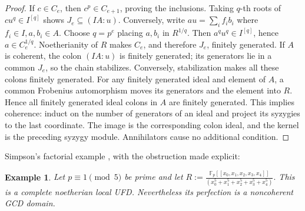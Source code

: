 \documentclass[11pt,a4paper]{amsart}
\numberwithin{equation}{section}
\newtheorem{example}[theorem]{Example}\newtheorem{notation}[theorem]{Notation}
\newcommand{\FF}{\mathbb F}
\begin{document}
\begin{proof}
If $c\in C_e$, then $c^p\in C_{e+1}$, proving the inclusions.
Taking $q$-th roots of	$cu^q\in I^{[q]}$ shows $J_e\subseteq(IA:u)$.
Conversely, write
$ au=\sum_i f_i b_i$ where $ f_i\in I, a,b_i\in A.$
Choose $q=p^e$ placing $a,b_i$ in $R^{1/q}$.
Then $a^qu^q\in I^{[q]}$, hence $a\in C_e^{1/q}$.
Noetherianity of $R$ makes $C_e$, and therefore $J_e$,
finitely generated.
 If $A$ is coherent, the colon $(IA:u)$ is finitely generated;
its generators lie in a common $J_e$, so the chain stabilizes.
Conversely, stabilization makes all these colons finitely generated.
	For any finitely generated ideal and element of $A$, a common
Frobenius automorphism moves its generators and the element into
$R$. Hence all finitely generated ideal colons in $A$ are
finitely generated. This implies coherence: induct on the number of generators of 	an ideal and project its syzygies to the last coordinate. The image is the corresponding colon ideal, and the kernel is
the preceding syzygy module. Annihilators cause no additional condition.
 \end{proof}
 
 Simpson's factorial example \cite[Example~2.6]{Simpson}, with the obstruction
 made explicit:
 
 \begin{example}\label{ex:simpson}
 Let $p\equiv1\pmod5$ be prime and let 
 $	R:=\frac{\FF_p[[x_0,x_1,x_2,x_3,x_4]]}
{(x_0^5+x_1^5+x_2^5+x_3^5+x_4^5)}.$	This is a complete noetherian local UFD. Nevertheless its perfection
 	is a noncoherent GCD domain. 
 \end{example}
 
\end{document}
